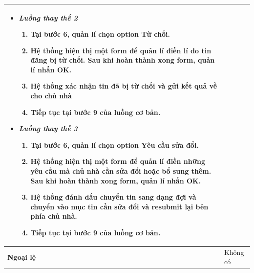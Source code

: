 \begin{center}
\begin{longtable}{ | l |p{10cm}|}
\begin{itemize}
			\item \textit{Luồng thay thế 2}
			\begin{enumerate}
				\item Tại bước 6, quản lí chọn option Từ chối.
				\item Hệ thống hiện thị một form để quản lí điền lí do tin đăng bị từ chối. Sau khi hoàn thành xong form, quản lí nhấn OK.
				\item Hệ thống xác nhận tin đã bị từ chối và gửi kết quả về cho chủ nhà 
				\item Tiếp tục tại bước 9 của luồng cơ bản.
			\end{enumerate}
			
			\item \textit{Luồng thay thế 3}
			\begin{enumerate}
				\item Tại bước 6, quản lí chọn option Yêu cầu sửa đổi.
				\item Hệ thống hiện thị một form để quản lí điền những yêu cầu mà chủ nhà cần sửa đổi hoặc bổ sung thêm. Sau khi hoàn thành xong form, quản lí nhấn OK.
				\item Hệ thống đánh dấu chuyển tin sang dạng đợi và chuyển vào mục tin cần sửa đổi và resubmit lại bên phía chủ nhà.
				\item Tiếp tục tại bước 9 của luồng cơ bản.
			\end{enumerate}
		\end{itemize} \\ \hline 
		\textbf{Ngoại lệ}  & Không có \\
		\hline
	\end{longtable}
\end{center}